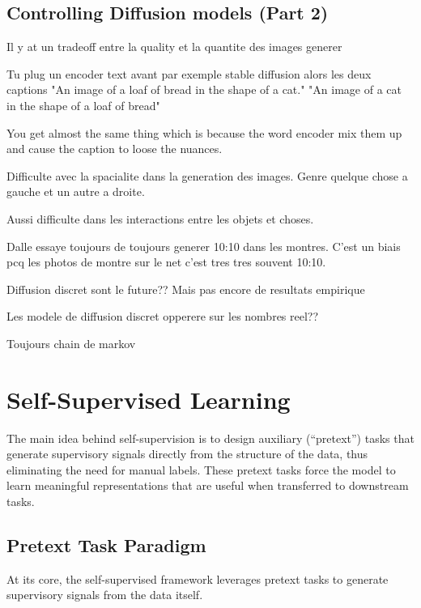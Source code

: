 \documentclass{article}
\begin{document}
\subsection{Controlling Diffusion models (Part 2)}

Il y at un tradeoff entre la quality et la quantite des images generer

Tu plug un encoder text avant par exemple stable diffusion alors les deux captions
"An image of a loaf of bread in the shape of a cat."
"An image of a cat in the shape of a loaf of bread"

You get almost the same thing which is because the word encoder mix them up and cause the caption to loose the nuances.

Difficulte avec la spacialite dans la generation des images. Genre quelque chose a gauche et un autre a droite.

Aussi difficulte dans les interactions entre les objets et choses.

Dalle essaye toujours de toujours generer 10:10 dans les montres. C'est un biais pcq les photos de montre sur le net c'est tres tres souvent 10:10.

Diffusion discret sont le future?? Mais pas encore de resultats empirique

Les modele de diffusion discret opperere sur les nombres reel??

Toujours chain de markov

\clearpage\newpage

\section{Self-Supervised Learning}

The main idea behind self-supervision is to design auxiliary (“pretext”) tasks that generate supervisory signals directly from the structure of the data, thus eliminating the need for manual labels. These pretext tasks force the model to learn meaningful representations that are useful when transferred to downstream tasks.

\subsection{Pretext Task Paradigm}

At its core, the self-supervised framework leverages pretext tasks to generate supervisory signals from the data itself.
\end{document}
